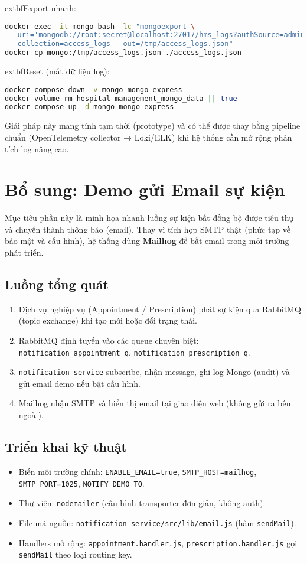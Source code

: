 \documentclass[12pt,a4paper]{report}
\begin{document}
	extbf{Export nhanh:}
\begin{lstlisting}[language=bash]
docker exec -it mongo bash -lc "mongoexport \
 --uri='mongodb://root:secret@localhost:27017/hms_logs?authSource=admin' \
 --collection=access_logs --out=/tmp/access_logs.json"
docker cp mongo:/tmp/access_logs.json ./access_logs.json
\end{lstlisting}
	extbf{Reset (mất dữ liệu log):}
\begin{lstlisting}[language=bash]
docker compose down -v mongo mongo-express
docker volume rm hospital-management_mongo_data || true
docker compose up -d mongo mongo-express
\end{lstlisting}
Giải pháp này mang tính tạm thời (prototype) và có thể được thay bằng pipeline chuẩn (OpenTelemetry collector → Loki/ELK) khi hệ thống cần mở rộng phân tích log nâng cao.

\section{Bổ sung: Demo gửi Email sự kiện}\label{sec:email-demo}
Mục tiêu phần này là minh họa nhanh luồng sự kiện bất đồng bộ được tiêu thụ và chuyển thành thông báo (email). Thay vì tích hợp SMTP thật (phức tạp về bảo mật và cấu hình), hệ thống dùng \textbf{Mailhog} để bắt email trong môi trường phát triển.

\subsection*{Luồng tổng quát}
\begin{enumerate}
    \item Dịch vụ nghiệp vụ (Appointment / Prescription) phát sự kiện qua RabbitMQ (topic exchange) khi tạo mới hoặc đổi trạng thái.
    \item RabbitMQ định tuyến vào các queue chuyên biệt: \texttt{notification\_appointment\_q}, \texttt{notification\_prescription\_q}.
    \item \texttt{notification-service} subscribe, nhận message, ghi log Mongo (audit) và gửi email demo nếu bật cấu hình.
    \item Mailhog nhận SMTP và hiển thị email tại giao diện web (không gửi ra bên ngoài).
\end{enumerate}

\subsection*{Triển khai kỹ thuật}
\begin{itemize}
    \item Biến môi trường chính: \texttt{ENABLE\_EMAIL=true}, \texttt{SMTP\_HOST=mailhog}, \texttt{SMTP\_PORT=1025}, \texttt{NOTIFY\_DEMO\_TO}.
    \item Thư viện: \texttt{nodemailer} (cấu hình transporter đơn giản, không auth).
    \item File mã nguồn: \texttt{notification-service/src/lib/email.js} (hàm \texttt{sendMail}).
    \item Handlers mở rộng: \texttt{appointment.handler.js}, \texttt{prescription.handler.js} gọi \texttt{sendMail} theo loại routing key.
\end{itemize}
\end{document}

